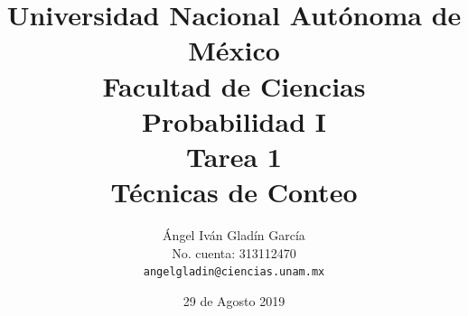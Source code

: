 \documentclass[11pt,letterpaper]{report}
\begin{document}
\title{
        Universidad Nacional Autónoma de México\\
        Facultad de Ciencias\\
        Probabilidad I\\
    \vspace{1cm}
    \large
        \textbf{Tarea 1}\\
        \textbf{Técnicas de Conteo}
}
\author{
    Ángel Iván Gladín García\\
    No. cuenta: 313112470\\
    \texttt{angelgladin@ciencias.unam.mx}
}
\date{29 de Agosto 2019}
\maketitle

\newtheorem{theorem}{Teorema}
\newtheorem{example}{Ejemplo}
\newtheorem{corollary}{Corolario}
\newtheorem{lemma}{Lemma}
\newtheorem{definition}{Definicion}
\newtheorem{prop}{Proposicion}
\end{document}
